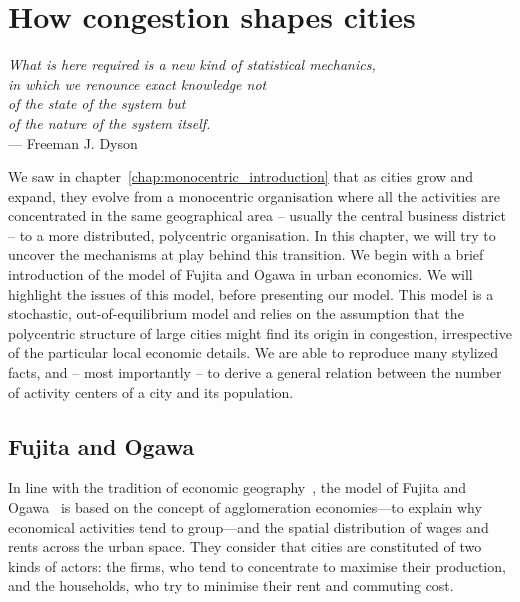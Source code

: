 \chapter{How congestion shapes cities}
\label{chap:monocentric_model}

\begin{flushright}{\slshape    
What is here required is a new kind of statistical mechanics,\\
in which we renounce exact knowledge not\\
of the state of the system but\\
of the nature of the system itself.}  \\ \medskip
--- Freeman J. Dyson~\cite{Dyson:1962}
\end{flushright}


\bigskip


We saw in chapter~\ref{chap:monocentric_introduction} that as cities grow and
expand, they evolve from a monocentric organisation where all the activities are
concentrated in the same geographical area -- usually the central business
district -- to a more distributed, polycentric organisation. In this chapter, we
will try to uncover the mechanisms at play behind this transition. We begin with
a brief introduction of the model of Fujita and Ogawa in urban economics. We
will highlight the issues of this model, before presenting our model. This model
is a stochastic, out-of-equilibrium model and relies on the assumption that the
polycentric structure of large cities might find its origin in congestion,
irrespective of the particular local economic details. We are able to reproduce
many stylized facts, and -- most importantly -- to derive a general relation
between the number of activity centers of a city and its population. 


\section{Fujita and Ogawa}
\label{sec:fujita_and_ogawa}

In line with the tradition of economic geography~\cite{Fujita:2001}, the model
of Fujita and Ogawa~\cite{Fujita:1982} is based on the concept of agglomeration
economies---to explain why economical activities tend to group---and the spatial
distribution of wages and rents across the urban space. They consider that
cities are constituted of two kinds of actors: the firms, who tend to
concentrate to maximise their production, and the households, who try to
minimise their rent and commuting cost.\\ 

